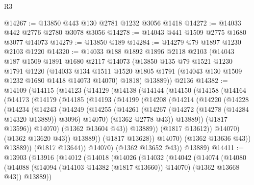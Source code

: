 \begin{lexlean}{R3}
\begin{coremodule}
@14267 := @13850 @443 @130 @2781 @1232 @3056 @1418
@14272 := @14033 @442 @2776 @2780 @3078 @3056
@14278 := @14043 @441 @1509 @2775 @1680 @3077 @14073
@14279 := @13850 @189
@14284 := @14279 @79 @1897 @1230 @2103 @1220
@14320 := @14033
    @188
    @1892
    @1896
    @2118
    @2103
    (@14043
      @187
      @1509
      @1891
      @1680
      @2117
      @14073
      (@13850
        @135
        @79
        @1521
        @1230
        @1791
        @1220
        (@14033
          @134
          @1511
          @1520
          @1805
          @1791
          (@14043 @130 @1509 @1232 @1680 @1418 @14073 @14070)
          @1818)
        @13889))
    @2136
@14382 := @14109
    (@14115
      (@14123
        (@14129
          (@14138
            (@14144
              (@14150
                (@14158
                  (@14164
                    (@14173
                      (@14179
                        (@14185
                          (@14193
                            (@14199
                              (@14208
                                (@14214
                                  (@14220
                                    (@14228
                                      (@14234
                                        (@14243
                                          (@14249
                                            (@14255
                                              (@14261
                                                (@14267
                                                  (@14272 (@14278 (@14284 @14320 @13889)) @3096)
                                                  @14070)
                                                (@1362 @2778 @43))
                                              @13889))
                                          (@1817 @13596))
                                        @14070)
                                      (@1362 @13604 @43))
                                    @13889))
                                (@1817 @13612))
                              @14070)
                            (@1362 @13620 @43))
                          @13889))
                      (@1817 @13628))
                    @14070)
                  (@1362 @13636 @43))
                @13889))
            (@1817 @13644))
          @14070)
        (@1362 @13652 @43))
      @13889)
@14411 := @13903
    (@13916
      (@14012
        (@14018
          (@14026
            (@14032
              (@14042
                (@14074
                  (@14080
                    (@14088 (@14094 (@14103 @14382 (@1817 @13660)) @14070) (@1362 @13668 @43))
                    @13889))

\end{coremodule}
\end{lexlean}
